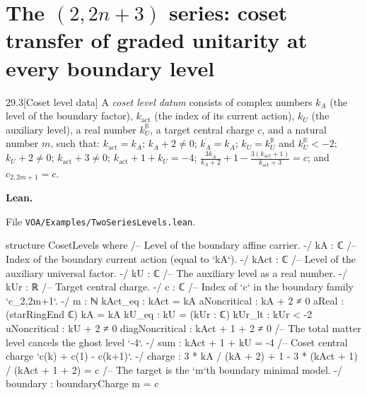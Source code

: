 \documentclass[11pt,openany]{book}
\newcommand{\lean}[1]{\texttt{\detokenize{#1}}}
\newcommand{\leanpath}[1]{\texttt{\small #1}}
\theoremstyle{definition}
\theoremstyle{plain}
\begin{document}
\chapter[The (2,2n+3) series: coset transfer at every boundary level]{The \texorpdfstring{$(2,2n+3)$}{(2,2n+3)} series: coset transfer of graded unitarity at every boundary level}
\begingroup
\providecommand{\ltwentyninesl}{\mathfrak{sl}_2}
\providecommand{\ltwentyninegr}{\operatorname{gr}}
\providecommand{\ltwentyninevac}{|0\rangle}
\providecommand{\ltwentynineGU}{\mathrm{GU}}
\providecommand{\ltwentynineJ}{J_\infty}
\providecommand{\ltwentynineinv}{\mathcal I}
\providecommand{\ltwentyninegc}{g}
\providecommand{\ltwentynineRn}{R_n}
\providecommand{\ltwentynineS}{S_{n,r}}
\providecommand{\ltwentynineR}{\mathbb{R}}
\providecommand{\ltwentynineln}[1]{\nolinkurl{#1}}
\par\medskip
\begin{bdefinition}{29.3}[Coset level data]
A \emph{coset level datum} consists of complex numbers $k_A$ (the level of the boundary factor), $k_{\mathrm{act}}$
(the index of its current action), $k_U$ (the auxiliary level), a real number $k_U^{\ltwentynineR}$, a target central charge
$c$, and a natural number $m$, such that: $k_{\mathrm{act}}=k_A$; $k_A+2\ne0$; $\overline{k_A}=k_A$;
$k_U=k_U^{\ltwentynineR}$ and $k_U^{\ltwentynineR}<-2$; $k_U+2\ne0$; $k_{\mathrm{act}}+3\ne0$; $k_{\mathrm{act}}+1+k_U=-4$;
$\frac{3k_A}{k_A+2}+1-\frac{3(k_{\mathrm{act}}+1)}{k_{\mathrm{act}}+3}=c$; and $c_{2,2m+1}=c$.
\end{bdefinition}
{\raggedright\noindent\textbf{Lean.} \lean{VOA.}\allowbreak\lean{TwoSeries.}\allowbreak\lean{CosetLevels}\par}
{\raggedright\noindent File \leanpath{VOA/\allowbreak Examples/\allowbreak TwoSeriesLevels.lean}.\par}
\begin{leancode}
structure CosetLevels where
  /-- Level of the boundary affine carrier. -/
  kA : ℂ
  /-- Index of the boundary current action (equal to `kA`). -/
  kAct : ℂ
  /-- Level of the auxiliary universal factor. -/
  kU : ℂ
  /-- The auxiliary level as a real number. -/
  kUr : ℝ
  /-- Target central charge. -/
  c : ℂ
  /-- Index of `c` in the boundary family `c_{2,2m+1}`. -/
  m : ℕ
  kAct_eq : kAct = kA
  aNoncritical : kA + 2 ≠ 0
  aReal : (starRingEnd ℂ) kA = kA
  kU_eq : kU = (kUr : ℂ)
  kUr_lt : kUr < -2
  uNoncritical : kU + 2 ≠ 0
  diagNoncritical : kAct + 1 + 2 ≠ 0
  /-- The total matter level cancels the ghost level `-4`. -/
  sum : kAct + 1 + kU = -4
  /-- Coset central charge `c(k) + c(1) - c(k+1)`. -/
  charge : 3 * kA / (kA + 2) + 1 - 3 * (kAct + 1) / (kAct + 1 + 2) = c
  /-- The target is the `m`th boundary minimal model. -/
  boundary : boundaryCharge m = c
\end{leancode}
\end{document}
